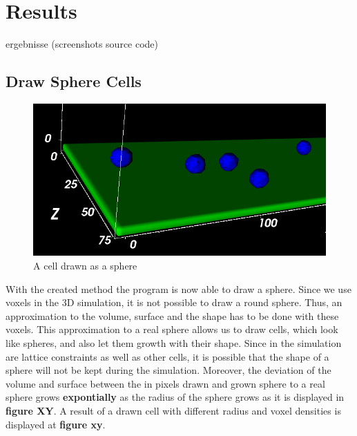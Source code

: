 \chapter{Results}
ergebnisse (screenshots \/ source code)

\section{Draw Sphere Cells}
\begin{figure}
	\center
	\includegraphics[scale=0.6]{figures/DrawnSphereCell.png}
	\caption{A cell drawn as a sphere}
	\label{img:DrawnSphereCell}
\end{figure}
With the created method the program is now able to draw a sphere. Since we use voxels in the 3D simulation, it is not possible to draw a round sphere. Thus, an approximation to the volume, surface and the shape has to be done with these voxels. This approximation to a real sphere allows us to draw cells, which look like spheres, and also let them growth with their shape. Since in the simulation are lattice constraints as well as other cells, it is possible that the shape of a sphere will not be kept during the simulation. Moreover, the deviation of the volume and surface between the in pixels drawn and grown sphere to a real sphere grows \textbf{expontially} as the radius of the sphere grows as it is displayed in \textbf{figure XY}.
A result of a drawn cell with different radius and voxel densities is displayed at \textbf{figure xy}.


